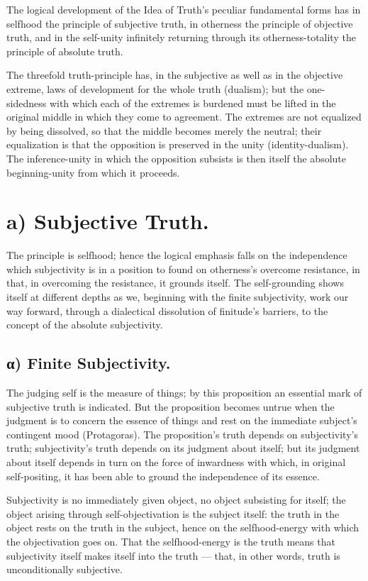\documentclass[12pt]{book}
\begin{document}
The logical development of the Idea of Truth's peculiar fundamental
forms has in selfhood the principle of subjective truth, in
otherness the principle of objective truth,
and in the self-unity infinitely returning through its
otherness-totality the principle of absolute truth.

The threefold truth-principle has, in the subjective as well as in
the objective extreme, laws of development for the whole truth
(dualism); but the one-sidedness with which each of the extremes is
burdened must be lifted in the original middle in which they come to
agreement. The extremes are not equalized by being dissolved, so
that the middle becomes merely the neutral; their equalization is
that the opposition is preserved in the unity (identity-dualism).
The inference-unity in which the opposition subsists is then itself
the absolute beginning-unity from which it proceeds.

\section*{a) Subjective Truth.}

The principle is selfhood; hence the logical emphasis falls on the
independence which subjectivity is in a position to found on
otherness's overcome resistance, in that, in overcoming the
resistance, it grounds itself. The self-grounding shows itself at
different depths as we, beginning with the finite subjectivity, work
our way forward, through a dialectical dissolution of finitude's
barriers, to the concept of the absolute subjectivity.

\subsection*{α) Finite Subjectivity.}

The judging self is the measure of things; by this proposition an
essential mark of subjective truth is indicated. But the proposition
becomes untrue when the judgment is to concern the essence of things
and rest on the immediate subject's contingent mood (Protagoras).
The proposition's truth depends on subjectivity's truth;
subjectivity's truth depends on its judgment about itself; but its
judgment about itself depends in turn on the force of inwardness
with which, in original self-positing, it has been able to ground
the independence of its essence.

Subjectivity is no immediately given object,
no object subsisting for itself; the object arising through
self-objectivation is the subject itself: the truth in the object
rests on the truth in the subject, hence on the selfhood-energy with
which the objectivation goes on. That the selfhood-energy is the
truth means that subjectivity itself makes itself into the truth ---
that, in other words, truth is unconditionally subjective.
\end{document}
